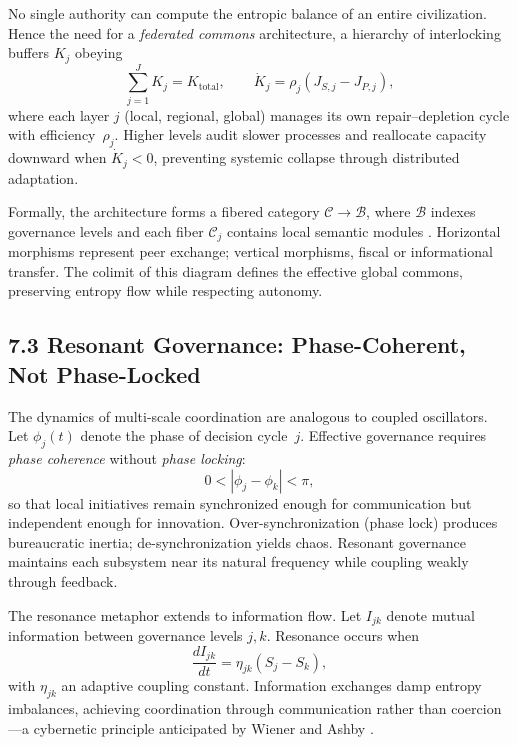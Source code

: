 \documentclass[11pt,a4paper,titlepage]{article}
\theoremstyle{definition}
\begin{document}
No single authority can compute the entropic balance of an entire civilization.
Hence the need for a \emph{federated commons} architecture,  
a hierarchy of interlocking buffers $K_j$ obeying
\begin{equation}
\sum_{j=1}^{J} K_j = K_{\text{total}},
\qquad
\dot{K}_j = \rho_j (J_{S,j} - J_{P,j}),
\label{eq:federated_commons}
\end{equation}
where each layer $j$ (local, regional, global) manages its own repair–depletion
cycle with efficiency~$\rho_j$.  
Higher levels audit slower processes and reallocate capacity downward when
$\dot{K}_j\!<\!0$, preventing systemic collapse through distributed adaptation.

Formally, the architecture forms a fibered category
$\mathcal{C}\!\to\!\mathcal{B}$,
where $\mathcal{B}$ indexes governance levels and
each fiber $\mathcal{C}_j$ contains local semantic modules
\cite{baez2017,baez2022}.  
Horizontal morphisms represent peer exchange; vertical morphisms, fiscal or
informational transfer.  
The colimit of this diagram defines the effective global commons, preserving
entropy flow while respecting autonomy.

\subsection{7.3 Resonant Governance: Phase-Coherent, Not Phase-Locked}

The dynamics of multi-scale coordination are analogous to coupled oscillators.
Let $\phi_j(t)$ denote the phase of decision cycle~$j$.
Effective governance requires \emph{phase coherence} without
\emph{phase locking}:
\begin{equation}
0 < |\phi_j - \phi_k| < \pi,
\label{eq:resonant_condition}
\end{equation}
so that local initiatives remain synchronized enough for communication but
independent enough for innovation.
Over-synchronization (phase lock) produces bureaucratic inertia;
de-synchronization yields chaos.
Resonant governance maintains each subsystem near its natural frequency
while coupling weakly through feedback.

The resonance metaphor extends to information flow.
Let $I_{jk}$ denote mutual information between governance levels $j,k$.
Resonance occurs when
\begin{equation}
\frac{dI_{jk}}{dt}
   = \eta_{jk}(S_j - S_k),
\label{eq:info_resonance}
\end{equation}
with $\eta_{jk}$ an adaptive coupling constant.
Information exchanges damp entropy imbalances, achieving coordination through
communication rather than coercion—a cybernetic principle anticipated by
Wiener and Ashby \cite{wiener1950,ashby1956}.
\end{document}
